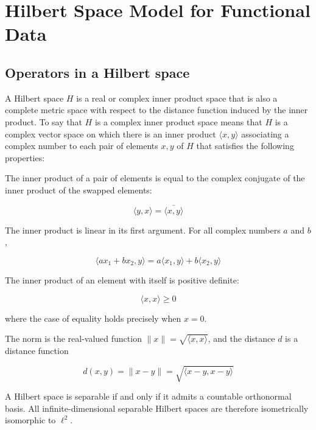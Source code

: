 \section{Hilbert Space Model for Functional Data}

\subsection{Operators in a Hilbert space}

A Hilbert space $H$ is a real or complex inner product space that is also a complete metric space with respect to the distance function induced by the inner product. To say that $H$ is a complex inner product space means that $H$ is a complex vector space on which there is an inner product $\langle{}x, y\rangle{}$ associating a complex number to each pair of elements $x, y$ of $H$ that satisfies the following properties:

The inner product of a pair of elements is equal to the complex conjugate of the inner product of the swapped elements:

\begin{equation}
  \langle{}y, x\rangle{} = \bar{\langle{}x, y\rangle{}}
\end{equation}

The inner product is linear in its first argument. For all complex numbers $a$ and $b$,

\begin{equation}
  \langle{}ax_1 + bx_2, y\rangle{} = a\langle{}x_1, y\rangle{} + b\langle{}x_2, y\rangle{}
\end{equation}

The inner product of an element with itself is positive definite:

\begin{equation}
  \langle{}x, x\rangle{} \geq 0
\end{equation}

where the case of equality holds precisely when $x = 0$.

The norm is the real-valued function $\|x\| = \sqrt{\langle{}x, x\rangle{}}$, and the distance $d$ is a distance function

\begin{equation}
  d(x, y) = \|x - y\| = \sqrt{\langle{}x - y, x - y\rangle{}}
\end{equation}

A Hilbert space is separable if and only if it admits a countable orthonormal basis. All infinite-dimensional separable Hilbert spaces are therefore isometrically isomorphic to $\ell^2$.


